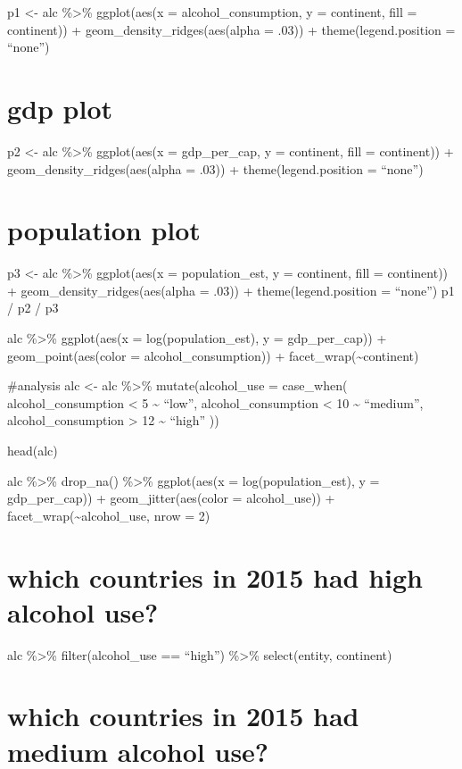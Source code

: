 \documentclass[
]{article}
\begin{document}
p1 \textless- alc \%\textgreater\% ggplot(aes(x = alcohol\_consumption,
y = continent, fill = continent)) + geom\_density\_ridges(aes(alpha =
.03)) + theme(legend.position = ``none'')

\hypertarget{gdp-plot}{%
\section{gdp plot}\label{gdp-plot}}

p2 \textless- alc \%\textgreater\% ggplot(aes(x = gdp\_per\_cap, y =
continent, fill = continent)) + geom\_density\_ridges(aes(alpha = .03))
+ theme(legend.position = ``none'')

\hypertarget{population-plot}{%
\section{population plot}\label{population-plot}}

p3 \textless- alc \%\textgreater\% ggplot(aes(x = population\_est, y =
continent, fill = continent)) + geom\_density\_ridges(aes(alpha = .03))
+ theme(legend.position = ``none'') p1 / p2 / p3

alc \%\textgreater\% ggplot(aes(x = log(population\_est), y =
gdp\_per\_cap)) + geom\_point(aes(color = alcohol\_consumption)) +
facet\_wrap(\textasciitilde continent)

\#analysis alc \textless- alc \%\textgreater\% mutate(alcohol\_use =
case\_when( alcohol\_consumption \textless{} 5 \textasciitilde{}
``low'', alcohol\_consumption \textless{} 10 \textasciitilde{}
``medium'', alcohol\_consumption \textgreater{} 12 \textasciitilde{}
``high'' ))

head(alc)

alc \%\textgreater\% drop\_na() \%\textgreater\% ggplot(aes(x =
log(population\_est), y = gdp\_per\_cap)) + geom\_jitter(aes(color =
alcohol\_use)) + facet\_wrap(\textasciitilde alcohol\_use, nrow = 2)

\hypertarget{which-countries-in-2015-had-high-alcohol-use}{%
\section{which countries in 2015 had high alcohol
use?}\label{which-countries-in-2015-had-high-alcohol-use}}

alc \%\textgreater\% filter(alcohol\_use == ``high'') \%\textgreater\%
select(entity, continent)

\hypertarget{which-countries-in-2015-had-medium-alcohol-use}{%
\section{which countries in 2015 had medium alcohol
use?}\label{which-countries-in-2015-had-medium-alcohol-use}}
\end{document}
